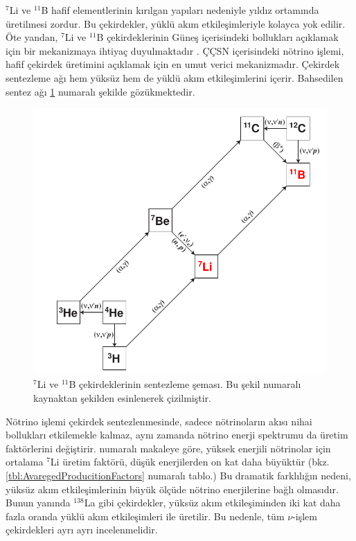 $ ^{7} $Li ve $ ^{11} $B hafif elementlerinin kırılgan yapıları nedeniyle yıldız ortamında üretilmesi zordur. Bu çekirdekler, yüklü akım etkileşimleriyle kolayca yok edilir. Öte yandan, $ ^{7} $Li ve $ ^{11} $B çekirdeklerinin Güneş içerisindeki bollukları açıklamak için bir mekanizmaya ihtiyaç duyulmaktadır \cite{2003ApJ...591.1220L}. ÇÇSN içerisindeki nötrino işlemi, hafif çekirdek üretimini açıklamak için en umut verici mekanizmadır. Çekirdek sentezleme ağı hem yüksüz hem de yüklü akım etkileşimlerini içerir. Bahsedilen sentez ağı \ref{fig:li7b11Network} numaralı şekilde gözükmektedir.

\begin{figure}[hbt!]
	\centering
	\includegraphics[width=\textwidth]{figures/li7B11_diagram}
	\caption[$ ^{7} $Li ve $ ^{11} $B Çekirdeklerinin Sentezleme Şeması.]{$ ^{7} $Li ve $ ^{11} $B çekirdeklerinin sentezleme şeması. Bu şekil \cite{Suzuki:2006qd} numaralı kaynaktan şekilden esinlenerek çizilmiştir.}
	\label{fig:li7b11Network}
\end{figure}

Nötrino işlemi çekirdek sentezlenmesinde, sadece nötrinoların akısı nihai bollukları etkilemekle kalmaz, aynı zamanda nötrino enerji spektrumu da üretim faktörlerini değiştirir. \cite{Sieverding:2018rdt} numaralı makaleye göre, yüksek enerjili nötrinolar için ortalama $ ^{7} $Li üretim faktörü, düşük enerjilerden on kat daha büyüktür (bkz. \ref{tbl:AvaregedProducitionFactors} numaralı tablo.) Bu dramatik farklılığın nedeni, yüksüz akım etkileşimlerinin büyük ölçüde nötrino enerjilerine bağlı olmasıdır. Bunun yanında $ ^{138} $La gibi çekirdekler, yüksüz akım etkileşiminden iki kat daha fazla oranda yüklü akım etkileşimleri ile üretilir. Bu nedenle, tüm $ \nu $-işlem çekirdekleri ayrı ayrı incelenmelidir.

